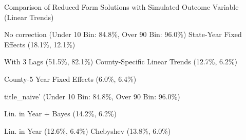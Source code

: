 \caption{Comparison of Reduced Form Solutions with Simulated Outcome Variable (Linear Trends) \label{fig:distributions-existing-solutions}}
\caption*{\color{p1line}{\textbf{\textemdash\textemdash}} No correction (Under 10 Bin: 84.8\%, Over 90 Bin: 96.0\%) \hspace{1cm} \color{p2line}{- - -} State-Year Fixed Effects (18.1\%, 12.1\%)}
\caption*{\color{p3line}{\textbf{- - -}} With 3 Lags (51.5\%, 82.1\%) \hspace{1cm} \color{p4line}{\textbf{- - -}} County-Specific Linear Trends (12.7\%, 6.2\%)}
\caption*{\color{p5line}{\textbf{- - -}} County-5 Year Fixed Effects (6.0\%, 6.4\%)}


\caption*{\color{p1line}{\textbf{\textemdash\textemdash}} title_naive' (Under 10 Bin: 84.8\%, Over 90 Bin: 96.0\%)}
\caption*{\color{p2line}{\textbf{- - -}} Lin. in Year + Bayes (14.2\%, 6.2\%)}
\caption*{\color{p3line}{\textbf{- - -}} Lin. in Year (12.6\%, 6.4\%) \hspace{1cm} \color{p4line}{\textbf{- - -}} Chebyshev (13.8\%, 6.0\%)}